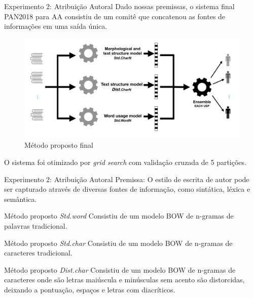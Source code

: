 \begin{frame}{Experimento 2: Atribuição Autoral}
	Dado nossas premissas, o sistema final PAN2018 para AA consistiu de um comitê que concatenou as fontes de informações em uma saída única.
	
	\begin{figure}[]\selectFont
	\caption{\selectFont Método proposto final}
	\includegraphics[width=.7\textwidth]{images/prop1_Diagramas.png}
	\end{figure}
	
	O sistema foi otimizado por {\it grid search} com validação cruzada de 5 partições.
	\end{frame}
	
	\begin{frame}{Experimento 2: Atribuição Autoral}
	Premissa: O estilo de escrita de autor pode ser capturado através de diversas fontes de informação, como sintática, léxica e semântica.
	\begin{block}{Método proposto {\it Std.word}}
	Consistiu de um modelo BOW de n-gramas de palavras tradicional.
	\end{block}
	\begin{block}{Método proposto {\it Std.char}}
	Consistiu de um modelo BOW de n-gramas de caracteres tradicional.
	\end{block}
	\begin{block}{Método proposto {\it Dist.char}}
	Consistiu de um modelo BOW de n-gramas de caracteres onde são letras maiúscula e minúsculas sem acento são distorcidas, deixando a pontuação, espaços e letras com diacríticos.
	\end{block}
\end{frame}

